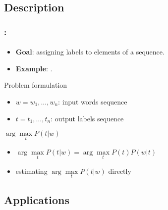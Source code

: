 \documentclass[xcolor=table]{beamer}
\begin{document}
\begin{frame}
	\frametitle{\insertshortsubtitle}
	\framesubtitle{\insertsection}
	
	
\end{frame}

\subsection{Description}

\begin{frame}
	\frametitle{\insertshortsubtitle: \insertsection}
	\framesubtitle{\insertsubsection}

	\begin{itemize}
		\item \textbf{Goal}: assigning labels to elements of a sequence.
		\item \textbf{Example}: .
	\end{itemize}
	
	\begin{block}{Problem formulation}
		\begin{itemize}
			\item $w = w_1, \ldots, w_n$: input words sequence
			\item $t = t_1, \ldots, t_n$: output labels sequence
		\end{itemize}
		\begin{center}
			$ \arg\max\limits_t P(t | w)$
		\end{center}
		
		\begin{itemize}
			\item {} $ \arg\max\limits_t P(t | w) = \arg\max\limits_t P(t) P(w | t) $
			\item {} estimating $\arg\max\limits_t P(t | w)$ directly
		\end{itemize}
	\end{block}

\end{frame}

\subsection{Applications}
\end{document}
